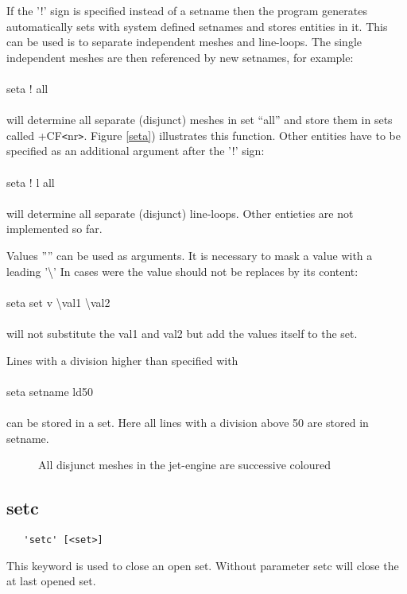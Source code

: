 \documentclass{article}
\begin{document}
If the '!' sign is specified instead of a setname then the program generates automatically sets with system defined setnames and stores entities in it. This can be used is to separate independent meshes and line-loops. The single independent meshes are then referenced by new setnames, for example:\\\\seta ! all\\\\will determine all separate (disjunct) meshes in set ``all'' and store them in sets called +CF\verb_<_nr\verb_>_. Figure \ref{seta}) illustrates this function. Other entities have to be specified as an additional argument after the '!' sign:\\\\seta ! l all\\\\will determine all separate (disjunct) line-loops. Other entieties are not implemented so far. 

Values '''' can be used as arguments. It is necessary to mask a value with a leading '\textbackslash{}' In cases were the value should not be replaces by its content:\\\\seta set v \textbackslash{}val1 \textbackslash{}val2\\\\will not substitute the val1 and val2 but add the values itself to the set.

Lines with a division higher than specified with\\\\
seta setname ld50\\\\
can be stored in a set. Here all lines with a division above 50 are stored in setname. 

  
\begin{figure}[h]
\caption{\label{engine}All disjunct meshes in the jet-engine are successive coloured}
\end{figure}

\subsection{\label{setc}setc}
\begin{verbatim}
   'setc' [<set>] 
\end{verbatim}
This keyword is used to close an open set. Without parameter setc will close the at last opened set.
\end{document}
